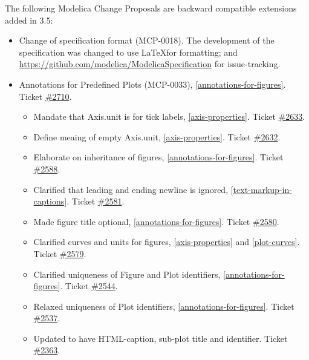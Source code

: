 The following Modelica Change Proposals are backward compatible extensions added in 3.5:
\begin{itemize}
\item Change of specification format (MCP-0018).
The development of the specification was changed to use \LaTeX for formatting; and \url{https://github.com/modelica/ModelicaSpecification} for issue-tracking.
\item Annotations for Predefined Plots (MCP-0033), \cref{annotations-for-figures}. Ticket \href{https://github.com/modelica/ModelicaSpecification/pull/2710}{\#2710}.
\begin{itemize}
\item Mandate that Axis.unit is for tick labels, \cref{axis-properties}.
Ticket \href{https://github.com/modelica/ModelicaSpecification/pull/2633}{\#2633}.
\item Define meaing of empty Axis.unit, \cref{axis-properties}.
Ticket \href{https://github.com/modelica/ModelicaSpecification/pull/2632}{\#2632}.
\item Elaborate on inheritance of figures, \cref{annotations-for-figures}.
Ticket \href{https://github.com/modelica/ModelicaSpecification/pull/2588}{\#2588}.
\item Clarified that leading and ending newline is ignored, \cref{text-markup-in-captions}.
Ticket \href{https://github.com/modelica/ModelicaSpecification/pull/2581}{\#2581}.
\item Made figure title optional, \cref{annotations-for-figures}.
Ticket \href{https://github.com/modelica/ModelicaSpecification/pull/2580}{\#2580}.
\item Clarified curves and units for figures, \cref{axis-properties} and \cref{plot-curves}.
Ticket \href{https://github.com/modelica/ModelicaSpecification/pull/2579}{\#2579}.
\item Clarified uniqueness of Figure and Plot identifiers, \cref{annotations-for-figures}.
Ticket \href{https://github.com/modelica/ModelicaSpecification/pull/2544}{\#2544}.
\item Relaxed uniqueness of Plot identifiers, \cref{annotations-for-figures}.
Ticket \href{https://github.com/modelica/ModelicaSpecification/pull/2537}{\#2537}.
\item Updated to have HTML-caption, sub-plot title and identifier.
Ticket \href{https://github.com/modelica/ModelicaSpecification/issues/2363}{\#2363}.
\end{itemize}
\end{itemize}

